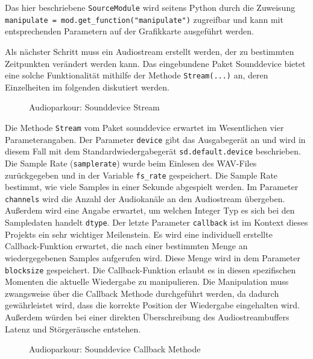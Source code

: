 Das hier beschriebene \texttt{SourceModule} wird seitens Python durch die Zuweisung  \texttt{manipulate = mod.get\_function("manipulate")} zugreifbar und kann mit entsprechenden Parametern auf der Grafikkarte ausgeführt werden.

Als nächster Schritt muss ein Audiostream erstellt werden, der zu bestimmten Zeitpunkten verändert werden kann. Das eingebundene Paket Sounddevice bietet eine solche Funktionalität mithilfe der Methode \texttt{Stream(...)} an, deren Einzelheiten im folgenden diskutiert werden.

\begin{figure}[h!]
	
	\caption{Audioparkour: Sounddevice Stream}
	\label{fig:audioparkour_sd_stream}
\end{figure}

Die Methode \texttt{Stream} vom Paket sounddevice erwartet im Wesentlichen vier Parameterangaben. Der Parameter \texttt{device} gibt das Ausgabegerät an und wird in diesem Fall mit dem Standardwiedergabegerät \texttt{sd.default.device} beschrieben. Die Sample Rate (\texttt{samplerate}) wurde beim Einlesen des WAV-Files zurückgegeben und in der Variable \texttt{fs\_rate} gespeichert. Die Sample Rate bestimmt, wie viele Samples in einer Sekunde abgespielt werden. Im Parameter \texttt{channels} wird die Anzahl der Audiokanäle an den Audiostream übergeben. Außerdem wird eine Angabe erwartet, um welchen Integer Typ es sich bei den Sampledaten handelt \texttt{dtype}. Der letzte Parameter \texttt{callback} ist im Kontext dieses Projekts ein sehr wichtiger Meilenstein. Es wird eine individuell erstellte Callback-Funktion erwartet, die nach einer bestimmten Menge an wiedergegebenen Samples aufgerufen wird. Diese Menge wird in dem Parameter \texttt{blocksize} gespeichert. Die Callback-Funktion erlaubt es in diesen spezifischen Momenten die aktuelle Wiedergabe zu manipulieren. Die Manipulation muss zwangsweise über die Callback Methode durchgeführt werden, da dadurch gewährleistet wird, dass die korrekte Position der Wiedergabe eingehalten wird. Außerdem würden bei einer direkten Überschreibung des Audiostreambuffers Latenz und Störgeräusche entstehen.

\begin{figure}[h!]
	
	
	
	
	
	
	\caption{Audioparkour: Sounddevice Callback Methode}
	\label{fig:audioparkour_sd_callback}
\end{figure}

